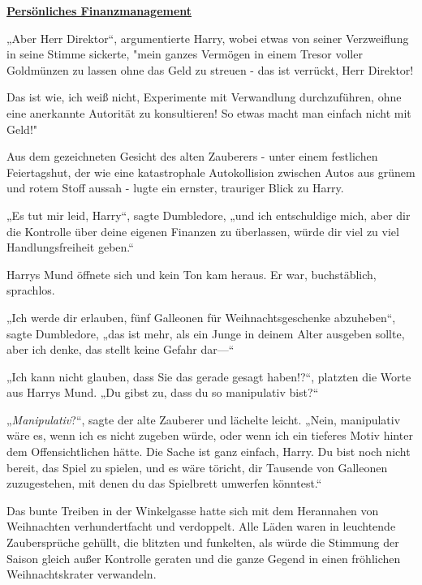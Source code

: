 

\hypertarget{persuxf6nliches-finanzmanagement}{%

\textbf{\uline{Persönliches Finanzmanagement}}

„Aber Herr Direktor“, argumentierte Harry, wobei etwas von seiner Verzweiflung in seine Stimme sickerte, "mein ganzes Vermögen in einem Tresor voller Goldmünzen zu lassen ohne das Geld zu streuen - das ist verrückt, Herr Direktor!

Das ist wie, ich weiß nicht, Experimente mit Verwandlung durchzuführen, ohne eine anerkannte Autorität zu konsultieren! So etwas macht man einfach nicht mit Geld!"

Aus dem gezeichneten Gesicht des alten Zauberers - unter einem festlichen Feiertagshut, der wie eine katastrophale Autokollision zwischen Autos aus grünem und rotem Stoff aussah - lugte ein ernster, trauriger Blick zu Harry.

„Es tut mir leid, Harry“, sagte Dumbledore, „und ich entschuldige mich, aber dir die Kontrolle über deine eigenen Finanzen zu überlassen, würde dir viel zu viel Handlungsfreiheit geben.“

Harrys Mund öffnete sich und kein Ton kam heraus. Er war, buchstäblich, sprachlos.

„Ich werde dir erlauben, fünf Galleonen für Weihnachtsgeschenke abzuheben“, sagte Dumbledore, „das ist mehr, als ein Junge in deinem Alter ausgeben sollte, aber ich denke, das stellt keine Gefahr dar—“

„Ich kann nicht glauben, dass Sie das gerade gesagt haben!?“, platzten die Worte aus Harrys Mund. „Du gibst zu, dass du so manipulativ bist?“

„\emph{Manipulativ}?“, sagte der alte Zauberer und lächelte leicht. „Nein, manipulativ wäre es, wenn ich es nicht zugeben würde, oder wenn ich ein tieferes Motiv hinter dem Offensichtlichen hätte. Die Sache ist ganz einfach, Harry. Du bist noch nicht bereit, das Spiel zu spielen, und es wäre töricht, dir Tausende von Galleonen zuzugestehen, mit denen du das Spielbrett umwerfen könntest.“

Das bunte Treiben in der Winkelgasse hatte sich mit dem Herannahen von Weihnachten verhundertfacht und verdoppelt. Alle Läden waren in leuchtende Zaubersprüche gehüllt, die blitzten und funkelten, als würde die Stimmung der Saison gleich außer Kontrolle geraten und die ganze Gegend in einen fröhlichen Weihnachtskrater verwandeln.

}
